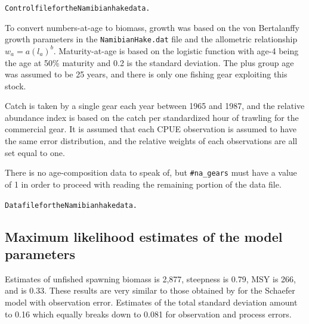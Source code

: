 \begin{multicols}{2}
\tiny
\noindent \hrulefill
\begin{alltt}
Control file for the Namibian hake data.

\end{alltt}
\hrulefill
\normalsize

To convert numbers-at-age to biomass, growth was based on the von Bertalanffy growth parameters in the \verb"NamibianHake.dat" file and the allometric relationship $w_a=a(l_a)^b$. Maturity-at-age is  based on the logistic function with age-4 being the age at 50\% maturity and 0.2 is the standard deviation. The plus group age was assumed to be 25 years, and there is only one fishing gear exploiting this stock.

Catch is taken by a single gear each year between 1965 and 1987, and the relative abundance index is based on the catch per standardized hour of trawling for the commercial gear.  It is assumed that each CPUE observation is assumed to have the same error distribution, and the relative weights of each observations are all set equal to one.

There is no age-composition data to speak of, but \verb"#na_gears" must have a value of 1 in order to proceed with reading the remaining portion of the data file.

\tiny
\noindent \hrulefill
\begin{alltt}
Data file for the Namibian hake data.

\end{alltt}
\hrulefill
\normalsize

\subsection{Maximum likelihood estimates of the model parameters}
Estimates of unfished spawning biomass is 2,877, steepness is 0.79, MSY is 266, and \fmsy is 0.33.  These results are  very similar to those obtained by \cite{hilborn1997ecological} for the Schaefer model with observation error.  Estimates of the total standard deviation amount to 0.16 which equally breaks down to 0.081 for observation and process errors.


\end{multicols}
